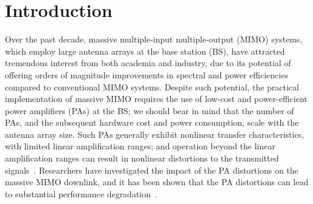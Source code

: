 \documentclass[10pt,twocolumn,twoside]{IEEEtran}
\begin{document}
 \fi

\ifconfver \else
    \ifplainver \else
        \newpage
\fi \fi





\maketitle

\section{Introduction}


Over the past decade, massive multiple-input multiple-output (MIMO) systems, which employ large antenna arrays at the base station (BS), have attracted tremendous interest from both academia and industry, due to its potential of offering orders of magnitude improvements in spectral and power efficiencies compared to conventional MIMO systems.
Despite such potential, the practical implementation of massive MIMO requires the use of low-cost and power-efficient power amplifiers (PAs) at the BS;
we should bear in mind that the number of PAs, and the subsequent hardware cost and power consumption, scale with the antenna array size.
Such PAs generally exhibit nonlinear transfer characteristics, with limited linear amplification ranges; and operation beyond the linear amplification ranges can result in nonlinear distortions to the transmitted signals~\cite{cripps2006rf}.
Researchers have investigated the impact of the PA distortions
on the massive MIMO downlink,
and it has been shown that the PA distortions can lead to substantial performance degradation~\cite{mollen2016waveforms,larsson2018out,anttila2019antenna,moghadam2018energy,moazzen2019performance}.
\end{document}
